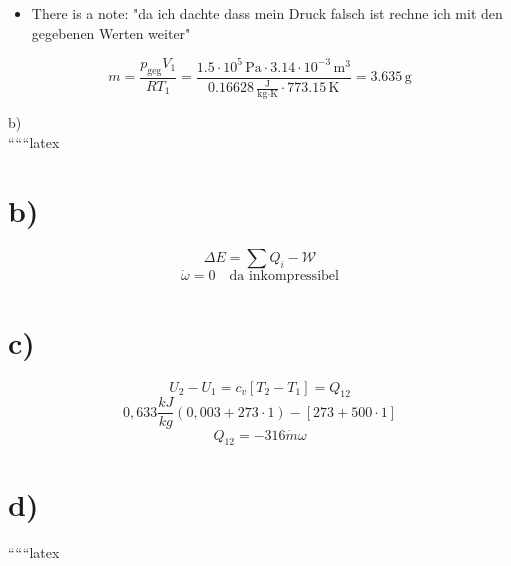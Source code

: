 \begin{itemize}
    \item There is a note: "da ich dachte dass mein Druck falsch ist rechne ich mit den gegebenen Werten weiter"
\end{itemize}

\[
m = \frac{p_{\text{geg}} V_1}{R T_1} = \frac{1.5 \cdot 10^5 \, \text{Pa} \cdot 3.14 \cdot 10^{-3} \, \text{m}^3}{0.16628 \, \frac{\text{J}}{\text{kg} \cdot \text{K}} \cdot 773.15 \, \text{K}} = 3.635 \, \text{g}
\]

b) \\

``````latex


\section*{b)}
\[
\Delta E = \sum Q_i - \mathcal{W}
\]
\[
\dot{\omega} = 0 \quad \text{da inkompressibel}
\]

\section*{c)}
\[
U_2 - U_1 = c_v \left[ T_2 - T_1 \right] = Q_{12}
\]
\[
0,633 \frac{kJ}{kg} \left(0,003 + 273 \cdot 1\right) - \left[273 + 500 \cdot 1\right]
\]
\[
Q_{12} = -316 \dot{m} \omega
\]

\section*{d)}

``````latex


